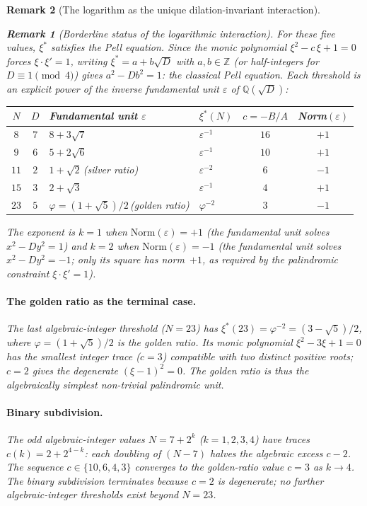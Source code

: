 \documentclass[12pt, a4paper]{article}
\newtheorem{remark}{Remark}[section]
\numberwithin{equation}{section}
\begin{document}
\begin{remark}[The logarithm as the unique dilation-invariant interaction]
\begin{remark}[Borderline status of the logarithmic interaction]
For these five values, $\xi^*$ satisfies the Pell equation.
Since the monic polynomial $\xi^2 - c\,\xi + 1 = 0$ forces
$\xi\cdot\xi' = 1$, writing $\xi^* = a + b\sqrt{D}$ with
$a, b \in \mathbb{Z}$ (or half-integers for $D \equiv 1 \pmod{4}$)
gives $a^2 - D b^2 = 1$: the classical Pell equation.
Each threshold is an explicit power of the inverse fundamental
unit $\varepsilon$ of $\mathbb{Q}(\sqrt{D})$:
\begin{center}
\begin{tabular}{ccllcc}
\toprule
$N$ & $D$ & Fundamental unit $\varepsilon$ &
$\xi^*(N)$ & $c = -B/A$ & Norm$(\varepsilon)$ \\
\midrule
$8$  & $7$ & $8 + 3\sqrt{7}$       & $\varepsilon^{-1}$
  & $16$ & $+1$ \\
$9$  & $6$ & $5 + 2\sqrt{6}$       & $\varepsilon^{-1}$
  & $10$ & $+1$ \\
$11$ & $2$ & $1 + \sqrt{2}$\,(silver ratio) & $\varepsilon^{-2}$
  & $6$  & $-1$ \\
$15$ & $3$ & $2 + \sqrt{3}$        & $\varepsilon^{-1}$
  & $4$  & $+1$ \\
$23$ & $5$ & $\varphi = (1{+}\sqrt{5})/2$\,(golden ratio)
  & $\varphi^{-2}$ & $3$  & $-1$ \\
\bottomrule
\end{tabular}
\end{center}
The exponent is $k = 1$ when $\mathrm{Norm}(\varepsilon) = +1$
(the fundamental unit solves $x^2 - Dy^2 = 1$) and $k = 2$ when
$\mathrm{Norm}(\varepsilon) = -1$ (the fundamental unit solves
$x^2 - Dy^2 = -1$; only its square has norm~$+1$, as required
by the palindromic constraint $\xi\cdot\xi' = 1$).

\paragraph{The golden ratio as the terminal case.}
The last algebraic-integer threshold ($N = 23$) has
$\xi^*(23) = \varphi^{-2} = (3 - \sqrt{5})/2$, where
$\varphi = (1{+}\sqrt{5})/2$ is the golden ratio.  Its monic
polynomial $\xi^2 - 3\xi + 1 = 0$ has the smallest integer
trace ($c = 3$) compatible with two distinct positive roots;
$c = 2$ gives the degenerate $(\xi{-}1)^2 = 0$.  The golden
ratio is thus the algebraically \emph{simplest} non-trivial
palindromic unit.

\paragraph{Binary subdivision.}
The odd algebraic-integer values $N = 7 + 2^k$ ($k = 1, 2, 3, 4$)
have traces $c(k) = 2 + 2^{4-k}$: each doubling of $(N{-}7)$
halves the algebraic excess $c - 2$.  The sequence
$c \in \{10, 6, 4, 3\}$ converges to the golden-ratio value
$c = 3$ as $k \to 4$.  The binary subdivision terminates because
$c = 2$ is degenerate; no further algebraic-integer thresholds
exist beyond $N = 23$.


\end{remark}
\end{remark}
\end{document}
